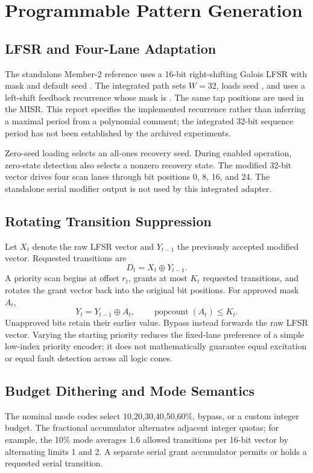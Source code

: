 \documentclass[conference,a4paper]{IEEEtran}
\newcommand{\rtl}[1]{\texttt{\detokenize{#1}}}
\begin{document}
\section{Programmable Pattern Generation}
\subsection{LFSR and Four-Lane Adaptation}
The standalone Member-2 reference uses a 16-bit right-shifting Galois LFSR with
mask \rtl{0xB400} and default seed \rtl{0xACE1}. The integrated path sets
$W=32$, loads seed \rtl{0x1ACEB00C}, and uses a left-shift feedback recurrence
whose mask is \rtl{0x00200003}. The same tap positions are used in the MISR.
This report specifies the implemented recurrence rather than inferring a
maximal period from a polynomial comment; the integrated 32-bit sequence
period has not been established by the archived experiments.

Zero-seed loading selects an all-ones recovery seed. During enabled operation,
zero-state detection also selects a nonzero recovery state. The modified
32-bit vector drives four scan lanes through bit positions 0, 8, 16, and 24.
The standalone serial modifier output is not used by this integrated adapter.

\subsection{Rotating Transition Suppression}
Let $X_t$ denote the raw LFSR vector and $Y_{t-1}$ the previously accepted
modified vector. Requested transitions are
\begin{equation}
 D_t=X_t\oplus Y_{t-1}.
\end{equation}
A priority scan begins at offset $r_t$, grants at most $K_t$ requested
transitions, and rotates the grant vector back into the original bit positions.
For approved mask $A_t$,
\begin{equation}
 Y_t=Y_{t-1}\oplus A_t,\qquad
 \operatorname{popcount}(A_t)\leq K_t.
\label{eq:modifier}
\end{equation}
Unapproved bits retain their earlier value. Bypass instead forwards the raw
LFSR vector. Varying the starting priority reduces the fixed-lane preference
of a simple low-index priority encoder; it does not mathematically guarantee
equal excitation or equal fault detection across all logic cones.

\subsection{Budget Dithering and Mode Semantics}
The nominal mode codes select 10,20,30,40,50,60\%, bypass, or a custom integer
budget. The fractional accumulator alternates adjacent integer quotas; for
example, the 10\% mode averages 1.6 allowed transitions per 16-bit vector by
alternating limits 1 and 2. A separate serial grant accumulator permits or
holds a requested serial transition.
\end{document}
